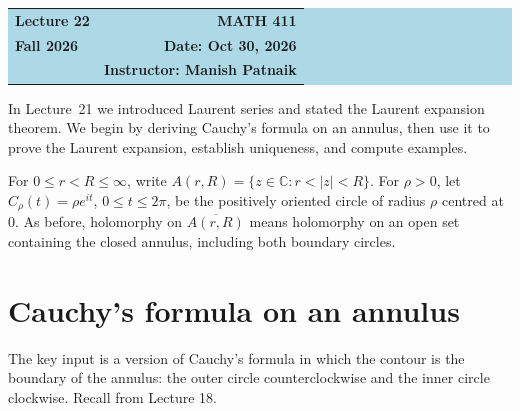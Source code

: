 \documentclass[11pt]{article}
\theoremstyle{plain}
\theoremstyle{definition}
\theoremstyle{boldremark}
\theoremstyle{remark}
\numberwithin{equation}{section}
\newcommand{\C}{\mathbb{C}}
\begin{document}
\setlength{\abovedisplayskip}{8pt plus 2pt minus 3pt}
\setlength{\belowdisplayskip}{8pt plus 2pt minus 3pt}
\setlength{\abovedisplayshortskip}{0pt plus 2pt}
\setlength{\belowdisplayshortskip}{5pt plus 2pt minus 2pt}

\begin{center}
  \colorbox{lightblue}{%
    \begin{minipage}{0.94\textwidth}
      \vspace{0.55em}
      \begin{tabular*}{\textwidth}{@{\extracolsep{\fill}}lr}
        {\color{courseblue}\bfseries\LARGE Lecture 22} &
        {\color{courseblue}\bfseries\LARGE MATH 411}\\[0.35em]
        \textbf{Fall 2026} & \textbf{Date: Oct 30, 2026}\\
        & \textbf{Instructor: Manish Patnaik}
      \end{tabular*}
      \vspace{0.45em}
    \end{minipage}}
\end{center}

\setcounter{tocdepth}{1}
\tableofcontents
\vspace{0.45em}

In Lecture~21 we introduced Laurent series and stated the Laurent
expansion theorem. We begin by deriving Cauchy's formula on an annulus,
then use it to prove the Laurent expansion, establish uniqueness, and
compute examples.

For $0\leq r<R\leq\infty$, write $A(r,R)=\{z\in\C:r<|z|<R\}$.
For $\rho>0$, let $C_\rho(t)=\rho e^{it}$, $0\leq t\leq2\pi$, be the
positively oriented circle of radius $\rho$ centred at $0$. As before,
holomorphy on $\overline{A(r,R)}$ means holomorphy on an open set
containing the closed annulus, including both boundary circles.

\section{Cauchy's formula on an annulus}
The key input is a version of Cauchy's formula in which the contour is the
boundary of the annulus: the outer circle counterclockwise and the inner
circle clockwise. Recall from Lecture 18.
\end{document}
